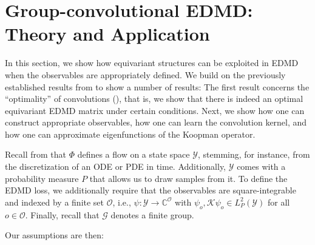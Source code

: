\documentclass[preprint,12pt,authoryear]{elsarticle}
\newcommand{\C}{\mathbb{C}}
\newcommand\Kc{\mathcal K}
\newcommand\Gc{\mathcal G}
\newcommand\Oc{\mathcal O}
\newcommand\Yc{\mathcal Y}
\newcommand\Koopman{\Kc}
\begin{document}
{\section{Group-convolutional EDMD: Theory and Application} \label{sec:equivariance-edmd}

In this section, we show how equivariant structures can be exploited in EDMD when the observables are appropriately defined. We build on the previously established results from  to show a number of results: The first result concerns the ``optimality'' of convolutions (), that is, we show that there is indeed an optimal equivariant EDMD matrix under certain conditions. Next, we show how one can construct appropriate observables, how one can learn the convolution kernel, and how one can approximate eigenfunctions of the Koopman operator.

Recall from  that $\Phi$ defines a flow on a state space $\Yc$, stemming, for instance, from the discretization of an ODE or PDE in time. Additionally, $\Yc$ comes with a probability measure $P$ that allows us to draw samples from it. To define the EDMD loss, we additionally require that the observables are square-integrable and indexed by a finite set $\Oc$, i.e., $\psi : \Yc \rightarrow \C^\Oc$ with $\psi_o, \Koopman \psi_o \in L^2_P(\Yc)$ for all $o \in \Oc$. Finally, recall that $\Gc$ denotes a finite group.

Our assumptions are then:

}
\end{document}

